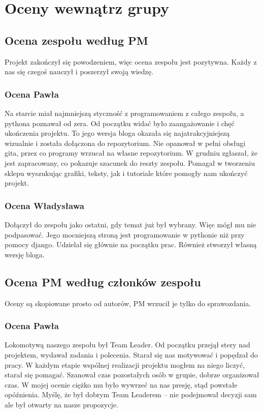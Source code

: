 \documentclass{article}
\begin{document}
\newpage
\section{Oceny wewnątrz grupy}
\subsection{Ocena zespołu według PM}
\par Projekt zakończył się powodzeniem, więc ocena zespołu jest pozytywna. Każdy z nas się czegoś nauczył i poszerzył swoją wiedzę.
\subsubsection{Ocena Pawła} \par Na starcie miał najmniejszą styczność z programowaniem z całego zespołu, a pythona poznawał od zera. Od początku widać było zaangażowanie i chęć ukończenia projektu. To jego wersja bloga okazała się najatrakcyjniejszą wizualnie i została dołączona do repozytorium. Nie opanował w pełni obsługi gita, przez co programy wrzucał na własne repozytorium. W grudniu zgłaszał, że jest zapracowany, co pokazuje szacunek do reszty zespołu. Pomagał w tworzeniu sklepu wyszukując grafiki, teksty, jak i tutoriale które pomogły nam ukończyć projekt.
\subsubsection{Ocena Władysława}
Dołączył do zespołu jako ostatni, gdy temat już był wybrany. Więc mógł mu nie podpasować. Jego mocniejszą stroną jest programowanie w pythonie niż przy pomocy django. Udzielał się głównie na początku prac. Również stworzył własną wersję bloga.
\newpage
\subsection{Ocena PM według członków zespołu}
Oceny są skopiowane prosto od autorów, PM wrzucił je tylko do sprawozdania.
\subsubsection{Ocena Pawła}
\par Lokomotywą naszego zespołu był Team Leader. Od początku przejął stery nad projektem, wydawał zadania i polecenia. Starał się nas motywować i popędzał do pracy. W każdym etapie wspólnej realizacji projektu mogłem na niego liczyć, starał się pomagać. Szanował czas pozostałych osób w grupie, dobrze organizował czas. W mojej ocenie ciężko mu było wywrzeć na nas presję, stąd powstałe opóźnienia. Myślę, że był dobrym Team Leaderem – nie podejmował decyzji sam ale był otwarty na nasze propozycje.
\end{document}
